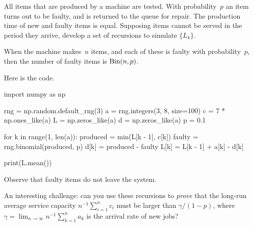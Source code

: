 \documentclass[stochastic-or.tex]{subfiles}
\begin{document}
\begin{exercise}
\label{ex:88}
All items
 that are produced by a machine are tested. With probability~$p$ an item turns out to be faulty, and is returned to the queue for repair. The production time of new and faulty items is equal.  Supposing  items cannot be served in the period they arrive,   develop a set of recursions to simulate $\{L_k\}$.
 \begin{hint}
 When the machine makes~$n$ items, and each of these is faulty with probability~$p$, then the number of faulty items is $\mathrm{Bin}(n, p)$.
 \end{hint}
\begin{solution}
Here is the code.
\begin{python}
import numpy as np

rng = np.random.default_rng(3)
a = rng.integers(3, 8, size=100)
c = 7 * np.ones_like(a)
L = np.zeros_like(a)
d = np.zeros_like(a)
p = 0.1

for k in range(1, len(a)):
    produced = min(L[k - 1], c[k])
    faulty = rng.binomial(produced, p)
    d[k] = produced - faulty
    L[k] = L[k - 1] + a[k] - d[k]

print(L.mean())
  \end{python}
Observe that faulty items do not leave the system.

An interesting challenge:  can you use these recursions to \emph{prove} that the long-run average service capacity $n^{-1}\sum_{i=1}^n c_i$ must be larger than $\gamma/(1-p)$, where $\gamma = \lim_{n\to \infty} n^{-1}\sum_{k=1}^n a_k$ is the arrival rate of new jobs?
\end{solution}
\end{exercise}
\end{document}
